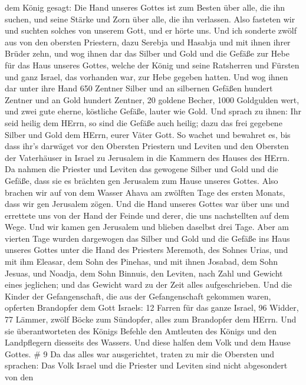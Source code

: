 dem König gesagt: Die Hand unseres Gottes ist zum Besten über alle, die
ihn suchen, und seine Stärke und Zorn über alle, die ihn verlassen.
 Also fasteten wir und suchten solches von unserem Gott,
und er hörte uns.  Und ich sonderte zwölf aus von den
obersten Priestern, dazu Serebja und Hasabja und mit ihnen ihrer Brüder
zehn,  und wog ihnen dar das Silber und Gold und die Gefäße
zur Hebe für das Haus unseres Gottes, welche der König und seine
Ratsherren und Fürsten und ganz Israel, das vorhanden war, zur Hebe
gegeben hatten.  Und wog ihnen dar unter ihre Hand 650
Zentner Silber und an silbernen Gefäßen hundert Zentner und an Gold
hundert Zentner,  20 goldene Becher, 1000 Goldgulden wert,
und zwei gute eherne, köstliche Gefäße, lauter wie Gold. 
Und sprach zu ihnen: Ihr seid heilig dem HErrn, so sind die Gefäße auch
heilig; dazu das frei gegebene Silber und Gold dem HErrn, eurer Väter
Gott.  So wachet und bewahret es, bis dass ihr's darwäget
vor den Obersten Priestern und Leviten und den Obersten der Vaterhäuser
in Israel zu Jerusalem in die Kammern des Hauses des HErrn.
 Da nahmen die Priester und Leviten das gewogene Silber und
Gold und die Gefäße, dass sie es brächten gen Jerusalem zum Hause
unseres Gottes.  Also brachen wir auf von dem Wasser Ahava
am zwölften Tage des ersten Monats, dass wir gen Jerusalem zögen. Und
die Hand unseres Gottes war über uns und errettete uns von der Hand der
Feinde und derer, die uns nachstellten auf dem Wege.  Und
wir kamen gen Jerusalem und blieben daselbst drei Tage. 
Aber am vierten Tage wurden dargewogen das Silber und Gold und die
Gefäße ins Haus unseres Gottes unter die Hand des Priesters Meremoth,
des Sohnes Urias, und mit ihm Eleasar, dem Sohn des Pinehas, und mit
ihnen Josabad, dem Sohn Jesuas, und Noadja, dem Sohn Binnuis, den
Leviten,  nach Zahl und Gewicht eines jeglichen; und das
Gewicht ward zu der Zeit alles aufgeschrieben.  Und die
Kinder der Gefangenschaft, die aus der Gefangenschaft gekommen waren,
opferten Brandopfer dem Gott Israels: 12 Farren für das ganze Israel, 96
Widder, 77 Lämmer, zwölf Böcke zum Sündopfer, alles zum Brandopfer dem
HErrn.  Und sie überantworteten des Königs Befehle den
Amtleuten des Königs und den Landpflegern diesseits des Wassers. Und
diese halfen dem Volk und dem Hause Gottes. \# 9  Da das
alles war ausgerichtet, traten zu mir die Obersten und sprachen: Das
Volk Israel und die Priester und Leviten sind nicht abgesondert von den
